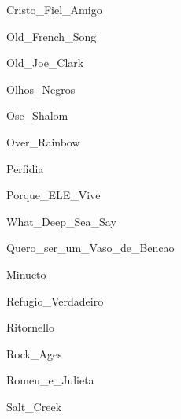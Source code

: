 \documentclass{scrartcl}
\begin{document}

{Cristo_Fiel_Amigo}


{Old_French_Song}


{Old_Joe_Clark}


{Olhos_Negros}


{Ose_Shalom}


{Over_Rainbow}


{Perfidia}


{Porque_ELE_Vive}


{What_Deep_Sea_Say}


{Quero_ser_um_Vaso_de_Bencao}


{Minueto}


{Refugio_Verdadeiro}


{Ritornello}


{Rock_Ages}


{Romeu_e_Julieta}


{Salt_Creek}
\end{document}
